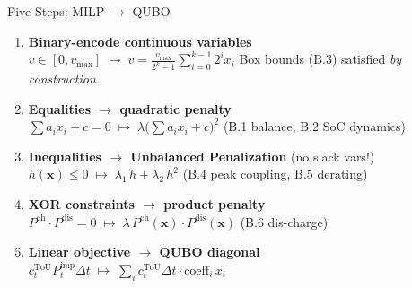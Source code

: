 \documentclass[aspectratio=169]{beamer}
\begin{document}
\begin{frame}{Five Steps: MILP $\to$ QUBO}
\footnotesize
\begin{enumerate}
    \item \textbf{Binary-encode continuous variables} \\[2pt]
          $v \in [0, v_{\max}] \;\longmapsto\;
           v = \tfrac{v_{\max}}{2^k-1}\sum_{i=0}^{k-1}2^i x_i$
          \hfill Box bounds (B.3) satisfied \emph{by construction.}

    \vspace{0.4em}
    \item \textbf{Equalities $\to$ quadratic penalty} \\[2pt]
          $\textstyle\sum a_i x_i + c = 0
           \;\longmapsto\; \lambda\bigl(\sum a_i x_i + c\bigr)^2$
          \hfill (B.1 balance, B.2 SoC dynamics)

    \vspace{0.4em}
    \item \textbf{Inequalities $\to$ Unbalanced Penalization} \alert{(no slack vars!)} \\[2pt]
          $h(\mathbf{x})\le 0
           \;\longmapsto\; \lambda_1\,h + \lambda_2\,h^2$
          \hfill (B.4 peak coupling, B.5 derating)

    \vspace{0.4em}
    \item \textbf{XOR constraints $\to$ product penalty} \\[2pt]
          $P^{\text{ch}}\cdot P^{\text{dis}} = 0
           \;\longmapsto\; \lambda\,P^{\text{ch}}(\mathbf{x})\cdot P^{\text{dis}}(\mathbf{x})$
          \hfill (B.6 dis-charge)

    \vspace{0.4em}
    \item \textbf{Linear objective $\to$ QUBO diagonal} \\[2pt]
          $c^{\text{ToU}}_t P^{\text{imp}}_t \Delta t
           \;\longmapsto\; \textstyle\sum_i c^{\text{ToU}}_t \Delta t \cdot \mathrm{coeff}_i\, x_i$
\end{enumerate}
\end{frame}
\end{document}

